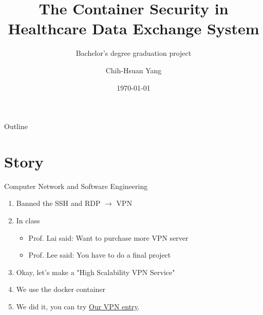 \documentclass{beamer}
\title{The Container Security in Healthcare Data Exchange System}
\subtitle{Bachelor's degree graduation project}
\author{Chih-Hsuan Yang}
\institute{National Sun Yat-sen University\\
Advisor: Chun-I Fan
}
\date{\today}
\begin{document}
\begin{CJK*}{UTF8}{bsmi}

  \begin{frame}
    \titlepage
  \end{frame}

  \begin{frame}{Outline}
    \begin{multicols}{2}
      \tableofcontents
    \end{multicols}
  \end{frame}


  \section{Story}
  \begin{frame}{Computer Network and Software Engineering}
    \begin{enumerate}
      \item Banned the SSH and RDP $\rightarrow$ VPN
      \item In class
            \begin{itemize}
              \item Prof. Lai said: Want to purchase more VPN server
              \item Prof. Lee said: You have to do a final project
            \end{itemize}
      \item Okay, let's make a "High Scalability VPN Service"
      \item We use the {\color{dockerColor}docker} container
      \item We did it, you can try \href{https://vpn.nsysuisc.tw}{\color{blue} Our VPN entry}.
    \end{enumerate}
  \end{frame}


\end{CJK*}
\end{document}
